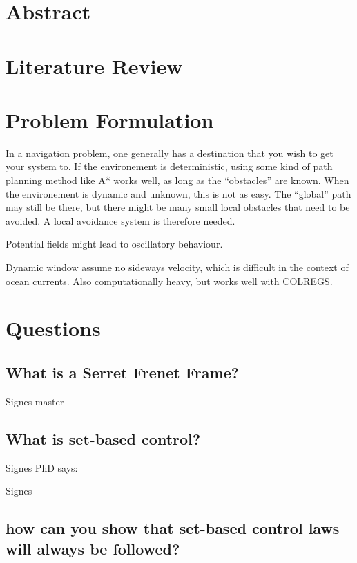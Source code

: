 \documentclass{article}
\begin{document}
\section{Abstract}


\section{Literature Review}


\section{Problem Formulation}

In a navigation problem, one generally has a destination that you wish
to get your system to. If the environement is deterministic, using
some kind of path planning method like A* works well, as long as the
``obstacles'' are known. When the environement is dynamic and unknown,
this is not as easy. The ``global'' path may still be there, but there
might be many small local obstacles that need to be avoided. A local
avoidance system is therefore needed.

Potential fields might lead to oscillatory behaviour.

Dynamic window assume no sideways velocity, which is difficult in the
context of ocean currents. Also computationally heavy, but works well
with COLREGS.

\section{Questions}
\subsection{What is a Serret Frenet Frame?}
Signes master

\subsection{What is set-based control?}
Signes PhD says:


Signes
\subsection{how can you show that set-based control laws will always be followed?}
\end{document}
